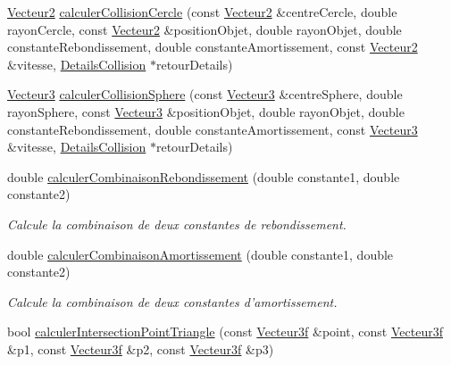 \begin{DoxyCompactItemize}
\hyperlink{group__utilitaire_ga6f7808e68c967b90bd7e737b7e1b78de}{Vecteur2} \hyperlink{namespaceaidecollision_ac7a15fb1d1661183de87524a1a7084fb}{calculer\-Collision\-Cercle} (const \hyperlink{group__utilitaire_ga6f7808e68c967b90bd7e737b7e1b78de}{Vecteur2} \&centre\-Cercle, double rayon\-Cercle, const \hyperlink{group__utilitaire_ga6f7808e68c967b90bd7e737b7e1b78de}{Vecteur2} \&position\-Objet, double rayon\-Objet, double constante\-Rebondissement, double constante\-Amortissement, const \hyperlink{group__utilitaire_ga6f7808e68c967b90bd7e737b7e1b78de}{Vecteur2} \&vitesse, \hyperlink{classaidecollision_1_1_details_collision}{Details\-Collision} $\ast$retour\-Details)
\item 
\hyperlink{group__utilitaire_ga541aa4837ad9250d3a248dc82ee9ad4d}{Vecteur3} \hyperlink{namespaceaidecollision_a32afc8d28fb424bc014af013be76c9fa}{calculer\-Collision\-Sphere} (const \hyperlink{group__utilitaire_ga541aa4837ad9250d3a248dc82ee9ad4d}{Vecteur3} \&centre\-Sphere, double rayon\-Sphere, const \hyperlink{group__utilitaire_ga541aa4837ad9250d3a248dc82ee9ad4d}{Vecteur3} \&position\-Objet, double rayon\-Objet, double constante\-Rebondissement, double constante\-Amortissement, const \hyperlink{group__utilitaire_ga541aa4837ad9250d3a248dc82ee9ad4d}{Vecteur3} \&vitesse, \hyperlink{classaidecollision_1_1_details_collision}{Details\-Collision} $\ast$retour\-Details)
\item 
double \hyperlink{namespaceaidecollision_a6237077a29518539015295311e39e2cc}{calculer\-Combinaison\-Rebondissement} (double constante1, double constante2)
\begin{DoxyCompactList}\small\item\em Calcule la combinaison de deux constantes de rebondissement. \end{DoxyCompactList}\item 
double \hyperlink{namespaceaidecollision_a617db5046c54f02f5bfa501aadc368d8}{calculer\-Combinaison\-Amortissement} (double constante1, double constante2)
\begin{DoxyCompactList}\small\item\em Calcule la combinaison de deux constantes d'amortissement. \end{DoxyCompactList}\item 
bool \hyperlink{namespaceaidecollision_a680fa1bfbc3e0d711f5934ec4602e228}{calculer\-Intersection\-Point\-Triangle} (const \hyperlink{group__utilitaire_ga6b2956069f76c7e27df4f79f87e5a48c}{Vecteur3f} \&point, const \hyperlink{group__utilitaire_ga6b2956069f76c7e27df4f79f87e5a48c}{Vecteur3f} \&p1, const \hyperlink{group__utilitaire_ga6b2956069f76c7e27df4f79f87e5a48c}{Vecteur3f} \&p2, const \hyperlink{group__utilitaire_ga6b2956069f76c7e27df4f79f87e5a48c}{Vecteur3f} \&p3)
\end{DoxyCompactItemize}


